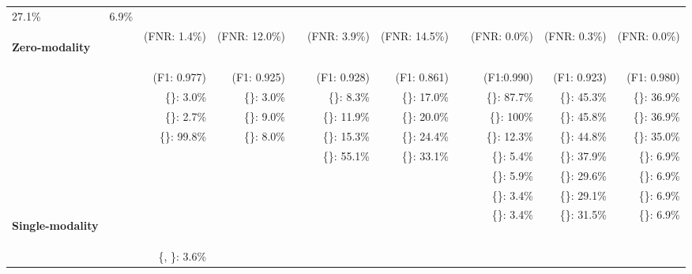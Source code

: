 \begin{table*}[t]
{\begin{tabular}{@{}l c rr c rr c rrr@{}}
27.1\%  & 
6.9\%\\                                                          
\multirow{-1}{*}{\begin{rotate}{90} {\bf Zero-modality} \end{rotate}}&& 
\colorbox{gray!90}{(FNR: 1.4\%)}   &
\colorbox{gray!90}{(FNR: 12.0\%)}  && 
\colorbox{gray!90}{(FNR: 3.9\%)}   & 
\colorbox{gray!90}{(FNR: 14.5\%)}  &&
(FNR: 0.0\%)    & 
(FNR: 0.3\%)   & 
(FNR: 0.0\%) \\
&& 
(F1: 0.977)    & 
(F1: 0.925)    && 
(F1: 0.928)    & 
(F1: 0.861)    &&
(F1:0.990)     & 
(F1: 0.923)    & 
(F1: 0.980) \\
\cmidrule{3-4}  \cmidrule{6-7}  \cmidrule{9-11} 
&& 
\{\audio{}\}: 3.0\%       &
\{\audio{}\}: 3.0\%       && 
\{\temperature{}\}: 8.3\%     & 
\{\temperature{}\}: 17.0\%    &&
\{\audio{}\}: 87.7\%     &
\{\audio{}\}: 45.3\%       &
\{\audio{}\}: 36.9\% \\
&& 
\{\bluetooth{}\}: 2.7\%       &
\{\bluetooth{}\}: 9.0\%       && 
\{\gas{}\}: 11.9\%        & 
\{\gas{}\}: 20.0\%        && 
\colorbox{gray!50}{\{\bluetooth{}\}: 100\%}         & 
\colorbox{gray!50}{\{\bluetooth{}\}: 45.8\%} &
\colorbox{gray!50}{\{\bluetooth{}\}: 36.9\%} \\
&& 
\colorbox{gray!20}{\{\wifi{}\}: 99.8\%}       & 
\colorbox{gray!20}{\{\wifi{}\}: 8.0\%}        && 
\{\humidity{}\}: 15.3\%   &
\{\humidity{}\}: 24.4\%   && 
\{\wifi{}\}: 12.3\%    & 
\{\wifi{}\}: 44.8\%   &
\{\wifi{}\}: 35.0\% \\
&&                      
&
&& 
\colorbox{gray!30}{\{\altitude{}\}: 55.1\%}   &
\colorbox{gray!30}{\{\altitude{}\}: 33.1\%}   && 
\{\altitude{}\}: 5.4\%    & 
\{\altitude{}\}: 37.9\%        &
\{\altitude{}\}: 6.9\%\\    
&&                      
& 
&&                      
& 
&& 
\{\gas{}\}: 5.9\%       & 
\{\gas{}\}: 29.6\%      &
\{\gas{}\}: 6.9\%\\    
&&                      
&
&&                      
& 
&& 
\{\humidity{}\}: 3.4\%      &
\{\humidity{}\}: 29.1\%       &
\{\humidity{}\}: 6.9\%\\
\multirow{-3}{*}{\begin{rotate}{90} {\bf Single-modality} \end{rotate}}&&                      
&
&&                      
& 
&& 
\{\temperature{}\}: 3.4\%       &
\{\temperature{}\}: 31.5\%      &
\{\temperature{}\}: 6.9\%\\
\cmidrule{3-4}  \cmidrule{6-7}  \cmidrule{9-11}
&& 
\{\audio{}, \bluetooth{}\}: 3.6\%     &

\end{tabular}}
\end{table*}
